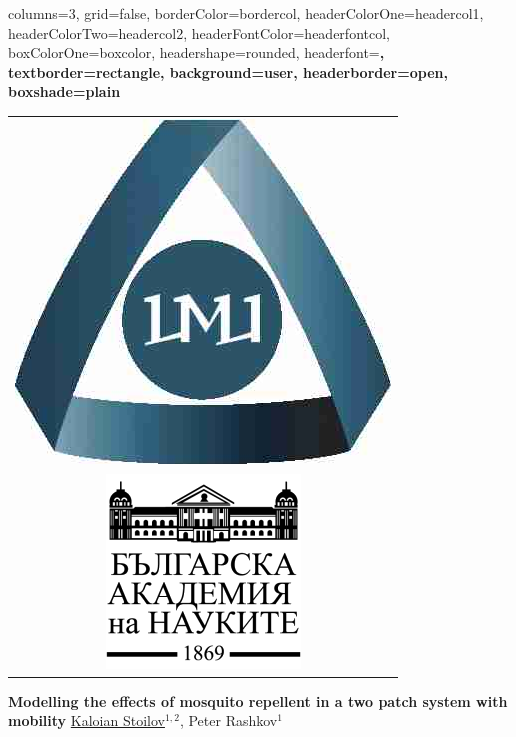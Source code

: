 \documentclass[a1paper,portrait,fontscale=0.45]{baposter}
\begin{document}
\begin{poster}
  {
    columns=3,
    grid=false,
    borderColor=bordercol, %
    headerColorOne=headercol1, %
    headerColorTwo=headercol2, %
    headerFontColor=headerfontcol, %
    boxColorOne=boxcolor, %
    headershape=rounded, %
    headerfont=\Large\sf\bf, %
    textborder=rectangle,
    background=user,
    headerborder=open, %
    boxshade=plain
  }
  {
    \begin{tabular}{c}
      \includegraphics[scale=0.12]{logo-imi.jpg}\\
      \includegraphics[scale=0.23]{logo-ban.png}
    \end{tabular}
  }
  {
    \sf\bf Modelling the effects of mosquito repellent in a two patch system with mobility
  }
  {
    \vspace{.5em} \underline{Kaloian Stoilov}${}^{1,2}$, Peter Rashkov${}^{1}$\\
}
\end{poster}
\end{document}
